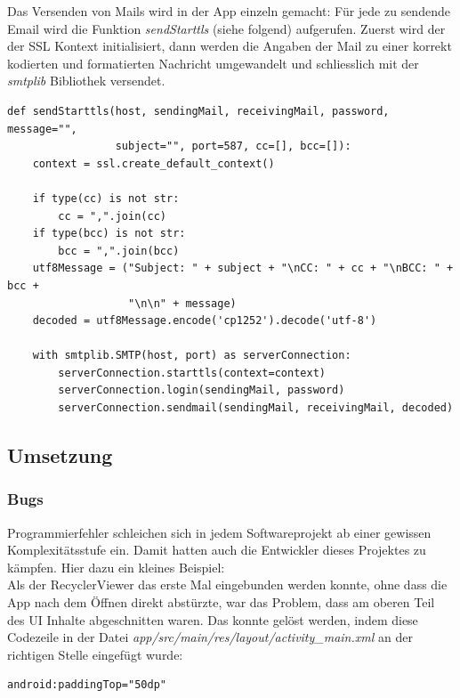 \documentclass[a4paper,11pt]{article}
\begin{document}

Das Versenden von Mails wird in der App einzeln gemacht: Für jede zu sendende Email wird die Funktion \textit{sendStarttls} (siehe folgend) aufgerufen. Zuerst wird der der SSL Kontext initialisiert, dann werden die Angaben der Mail zu einer korrekt kodierten und formatierten Nachricht umgewandelt und schliesslich mit der \textit{smtplib} Bibliothek versendet.

\lstset{language=python}
\begin{lstlisting}
def sendStarttls(host, sendingMail, receivingMail, password, message="",
                 subject="", port=587, cc=[], bcc=[]):
    context = ssl.create_default_context()

    if type(cc) is not str:
        cc = ",".join(cc)
    if type(bcc) is not str:
        bcc = ",".join(bcc)
    utf8Message = ("Subject: " + subject + "\nCC: " + cc + "\nBCC: " + bcc +
                   "\n\n" + message)
    decoded = utf8Message.encode('cp1252').decode('utf-8')

    with smtplib.SMTP(host, port) as serverConnection:
        serverConnection.starttls(context=context)
        serverConnection.login(sendingMail, password)
        serverConnection.sendmail(sendingMail, receivingMail, decoded)
\end{lstlisting}

\subsection{Umsetzung}
\subsubsection{Bugs}
Programmierfehler schleichen sich in jedem Softwareprojekt ab einer gewissen Komplexitätsstufe ein. Damit hatten auch die Entwickler dieses Projektes zu kämpfen. Hier dazu ein kleines Beispiel:\\

Als der RecyclerViewer das erste Mal eingebunden werden konnte, ohne dass die App nach dem Öffnen direkt abstürzte, war das Problem, dass am oberen Teil des UI Inhalte abgeschnitten waren. Das konnte gelöst werden, indem diese Codezeile in der Datei \textit{app/src/main/res/layout/activity\_main.xml} an der richtigen Stelle eingefügt wurde:

\lstset{language=XML}
\begin{lstlisting}
android:paddingTop="50dp"
\end{lstlisting}
\end{document}

